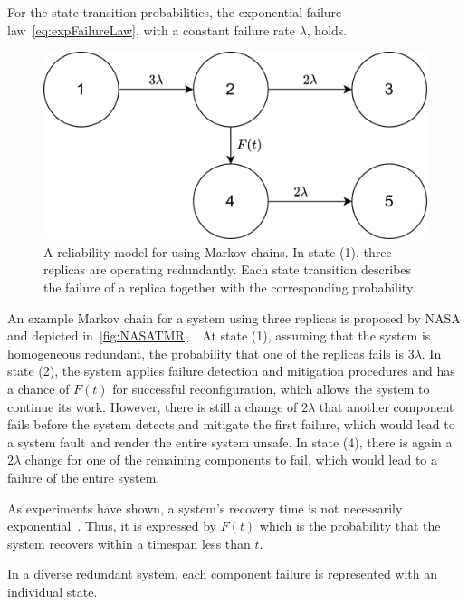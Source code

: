 For the state transition probabilities, the exponential failure law~\autoref{eq:expFailureLaw}, with a constant failure rate $\lambda$, holds.

\begin{figure}[!hb]
	\centering
	\includegraphics[width=0.75\linewidth]{images/TriplexSystemNASA}
	\caption{A reliability model for  using Markov chains. In state (1), three replicas are operating redundantly. Each state transition describes the failure of a replica together with the corresponding probability.}
	\label{fig:NASATMR}
\end{figure}

An example Markov chain for a system using three replicas is proposed by NASA and depicted in~\autoref{fig:NASATMR}~\cite{NASAMarkovChains}.
At state (1), assuming that the system is homogeneous redundant, the probability that one of the replicas fails is $3\lambda$.
In state (2), the system applies failure detection and mitigation procedures and has a chance of $F(t)$ for successful reconfiguration, which allows the system to continue its work.
However, there is still a change of $2\lambda$ that another component fails before the system detects and mitigate the first failure, which would lead to a system fault and render the entire system unsafe.
In state (4), there is again a $2\lambda$ change for one of the remaining components to fail, which would lead to a failure of the entire system.

As experiments have shown, a system's recovery time is not necessarily exponential~\cite{TheoryAndPracticeReliableSystem}.
Thus, it is expressed by $F(t)$ which is the probability that the system recovers within a timespan less than $t$.

In a diverse redundant system, each component failure is represented with an individual state.

